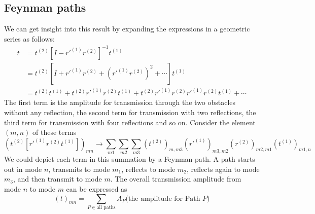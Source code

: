 \documentclass[11pt,a4paper]{book}
\theoremstyle{plain}
\theoremstyle{definition}
\theoremstyle{remark}
\begin{document}
\subsection{Feynman paths}
We can get insight into this result by expanding the expressions in a geometric series as follows:
\begin{equation}
    \begin{aligned}
        t & = t^{(2)} \left[ I - r'^{(1)} r^{(2)} \right]^{-1} t^{(1)} \\
        & = t^{(2)} \left[ I + r'^{(1)} r^{(2)} + (r'^{(1)} r^{(2)})^2 + \cdots \right] t^{(1)} \\
        & = t^{(2)} t^{(1)} + t^{(2)} r'^{(1)} r^{(2)} t^{(1)} + t^{(2)} r'^{(1)} r^{(2)} r'^{(1)} r^{(2)} t^{(1)} + \cdots
    \end{aligned}
\end{equation}
The first term is the amplitude for transmission through the two obstacles without any reflection, the second term for transmission with two reflections, the third term for transmission with four reflections and so on. Consider the element $(m,n)$ of these terms
\begin{equation}
\left( t^{(2)}[r'^{(1)}r^{(2)}t^{(1)}] \right)_{mn} \rightarrow \sum_{m1}\sum_{m2}\sum_{m3} \left( t^{(2)} \right)_{m,m3} \left( r'^{(1)} \right)_{m3,m2} \left( r^{(2)} \right)_{m2,m1} \left( t^{(1)} \right)_{m1,n}
\end{equation}
We could depict each term in this summation by a Feynman path. A path starts out in mode $n$, transmits to mode $m_1$, reflects to mode $m_2$, reflects again to mode $m_3$, and then transmit to mode $m$. The overall transmission amplitude from mode $n$ to mode $m$ can be expressed as
\begin{equation}
    (t)_{mn} = \sum_{P \in \mbox{all paths}} A_P \mbox{(the amplitude for Path $P$)}
\end{equation}
\end{document}
